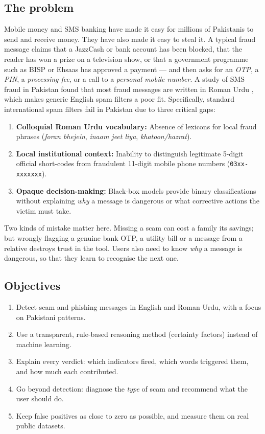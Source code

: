 \documentclass[11pt,a4paper]{article}
\begin{document}
\subsection{The problem}
Mobile money and SMS banking have made it easy for millions of Pakistanis to send and receive money.
They have also made it easy to steal it. A typical fraud message claims that a JazzCash or bank
account has been blocked, that the reader has won a prize on a television show, or that a
government programme such as BISP or Ehsaas has approved a payment --- and then asks for an
\emph{OTP}, a \emph{PIN}, a \emph{processing fee}, or a call to a \emph{personal mobile number}.
A study of SMS fraud in Pakistan found that most fraud messages are written in Roman Urdu
\cite{pervaiz2019}, which makes generic English spam filters a poor fit. Specifically, standard
international spam filters fail in Pakistan due to three critical gaps:
\begin{enumerate}[noitemsep]
  \item \textbf{Colloquial Roman Urdu vocabulary:} Absence of lexicons for local fraud phrases (\emph{foran bhejein}, \emph{inaam jeet liya}, \emph{khatoon/hazrat}).
  \item \textbf{Local institutional context:} Inability to distinguish legitimate 5-digit official short-codes from fraudulent 11-digit mobile phone numbers (\texttt{03xx-xxxxxxx}).
  \item \textbf{Opaque decision-making:} Black-box models provide binary classifications without explaining \emph{why} a message is dangerous or what corrective actions the victim must take.
\end{enumerate}

Two kinds of mistake matter here. Missing a scam can cost a family its savings; but wrongly flagging
a genuine bank OTP, a utility bill or a message from a relative destroys trust in the tool.
Users also need to know \emph{why} a message is dangerous, so that they learn to recognise the next one.

\subsection{Objectives}
\begin{enumerate}
  \item Detect scam and phishing messages in English and Roman Urdu, with a focus on Pakistani patterns.
  \item Use a transparent, rule-based reasoning method (certainty factors) instead of machine learning.
  \item Explain every verdict: which indicators fired, which words triggered them, and how much each contributed.
  \item Go beyond detection: diagnose the \emph{type} of scam and recommend what the user should do.
  \item Keep false positives as close to zero as possible, and measure them on real public datasets.
\end{enumerate}
\end{document}
